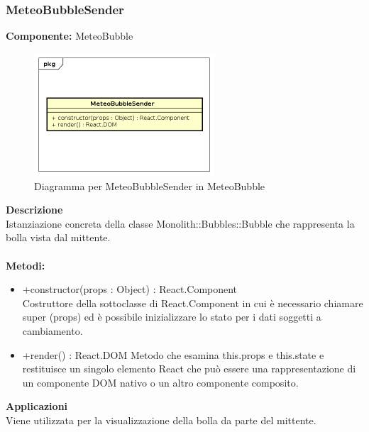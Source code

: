 \subsubsection{MeteoBubbleSender}
\textbf{Componente:}  MeteoBubble\\
   \FloatBarrier
   \begin{figure}[ht]
   \centering
   \includegraphics[width=0.6\textwidth]{img/single-MeteoBubbleSender}
   \caption{{Diagramma per MeteoBubbleSender in MeteoBubble}}
\end{figure}
\FloatBarrier
\textbf{Descrizione}\\
Istanziazione concreta della classe Monolith::Bubbles::Bubble che rappresenta la bolla vista dal mittente.
\\
\\
\textbf{Metodi:} 
\begin{itemize}
\item +constructor(props : Object) : React.Component 
\\
Costruttore della sottoclasse di React.Component in cui è necessario chiamare super (props) ed è possibile inizializzare lo stato per i dati soggetti a cambiamento.

\item +render() : React.DOM
Metodo che esamina this.props e this.state e restituisce un singolo elemento React che può essere una rappresentazione di un componente DOM nativo o un altro componente composito.

\end{itemize} 


\textbf{Applicazioni}\\
Viene utilizzata per la visualizzazione della bolla da parte del mittente. 


\clearpage

